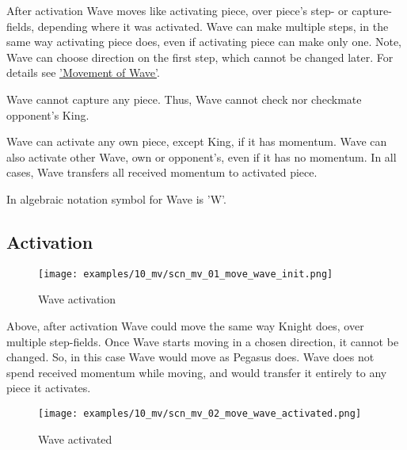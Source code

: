 After activation Wave moves like activating piece, over piece's step- or capture-
fields, depending where it was activated. Wave can make multiple steps, in the
same way activating piece does, even if activating piece can make only one. Note,
Wave can choose direction on the first step, which cannot be changed later. For
details see \hyperref[sec:Definitions/Movement of Wave]{'Movement of Wave'}.

Wave cannot capture any piece. Thus, Wave cannot check nor checkmate opponent's
King.

Wave can activate any own piece, except King, if it has momentum. Wave can
also activate other Wave, own or opponent's, even if it has no momentum. In
all cases, Wave transfers all received momentum to activated piece.

In algebraic notation symbol for Wave is 'W'.

\clearpage %

\subsection*{Activation}

\vspace*{-2.0ex}
\noindent
\begin{figure}[h]
\texttt{[image: examples/10\_mv/scn\_mv\_01\_move\_wave\_init.png]}
\caption{Wave activation}
\label{fig:scn_mv_01_move_wave_init}
\end{figure}

Above, after activation Wave could move the same way Knight does, over multiple
step-fields. Once Wave starts moving in a chosen direction, it cannot be changed.
So, in this case Wave would move as Pegasus does. Wave does not spend received
momentum while moving, and would transfer it entirely to any piece it activates.

\clearpage %

\noindent
\begin{figure}[h]
\texttt{[image: examples/10\_mv/scn\_mv\_02\_move\_wave\_activated.png]}
\caption{Wave activated}
\label{fig:scn_mv_02_move_wave_activated}
\end{figure}

